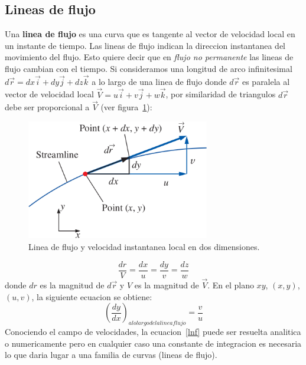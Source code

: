 \documentclass[10pt, oneside]{article}
\begin{document}
\subsection{Lineas de flujo}
Una \textbf{linea de flujo} es una curva que es tangente al vector de velocidad local en un instante de tiempo. Las lineas de flujo indican la direccion instantanea del movimiento del flujo. Esto quiere decir que en \emph{flujo no permanente} las lineas de flujo cambian con el tiempo. Si consideramos una longitud de arco infinitesimal $d\vec{r}=dx\vec{i}+dy\vec{j}+dz\vec{k}$ a lo largo de una linea de flujo donde $d\vec{r}$ es paralela al vector de velocidad local $\vec{V}=u\vec{i}+v\vec{j}+w\vec{k}$, por similaridad de triangulos $d\vec{r}$ debe ser proporcional a $\vec{V}$ (ver figura~\ref{strl}):
\begin{figure}[h]
\centering
\includegraphics[width=8cm]{strl}
\caption{Linea de flujo y velocidad instantanea local en dos dimensiones.}
\label{strl}
\end{figure}
$$
\frac{dr}{V}=\frac{dx}{u}=\frac{dy}{v}=\frac{dz}{w}
$$
donde $dr$ es la magnitud de $d\vec{r}$ y $V$ es la magnitud de $\vec{V}$. En el plano $xy$, $(x,y)$, $(u,v)$, la siguiente ecuacion se obtiene: 
\begin{equation}
\left(\frac{dy}{dx}\right)_{a lo largo de la linea flujo} = \frac{v}{u}
\label{lnf}
\end{equation}
Conociendo el campo de velocidades, la ecuacion~\ref{lnf} puede ser resuelta analitica o numericamente pero en cualquier caso una constante de integracion es necesaria lo que daria lugar a una familia de curvas (lineas de flujo).
\end{document}
